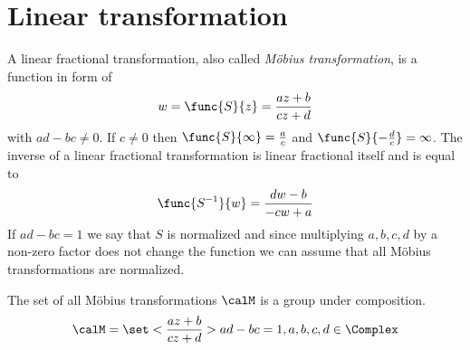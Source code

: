 \section{Linear transformation}
A linear fractional transformation, also called \textit{M{\"o}bius transformation},  is a function in form of 
\begin{equation*}
    w = \func{S}{z} = \dfrac{az + b}{cz + d}
\end{equation*}
with \(ad - bc \neq 0\). If \(c \neq 0\) then \(\func{S}{\infty} = \frac{a}{c}\) and \(\func{S}{-\frac{d}{c}} = \infty\). The inverse of a linear fractional transformation is linear fractional itself and is equal to 
\begin{equation*}
    \func{S^{-1}}{w}= \frac{dw - b}{-cw + a}
\end{equation*}
If \(ad -bc = 1\) we say that \(S\) is normalized and since multiplying \(a,b,c,d\) by a non-zero factor does not change the function we can assume that all M{\"o}bius transformations are normalized. 

\begin{theorem}
    The set of all M{\"o}bius transformations \(\calM\) is a group under composition.
    \begin{equation*}
        \calM = \set<\dfrac{az + b}{cz + d}> {ad - bc = 1, a,b,c,d \in \Complex}
    \end{equation*}
\end{theorem}

